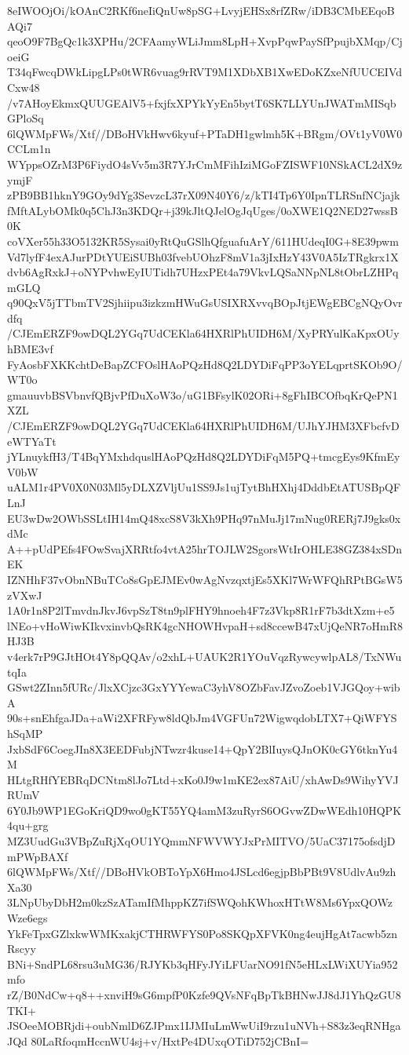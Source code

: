 8eIWOOjOi/kOAnC2RKf6neIiQnUw8pSG+LvyjEHSx8rfZRw/iDB3CMbEEqoBAQi7
qeoO9F7BgQc1k3XPHu/2CFAamyWLiJmm8LpH+XvpPqwPaySfPpujbXMqp/CjoeiG
T34qFwcqDWkLipgLPs0tWR6vuag9rRVT9M1XDbXB1XwEDoKZxeNfUUCEIVdCxw48
/v7AHoyEkmxQUUGEAlV5+fxjfxXPYkYyEn5bytT6SK7LLYUnJWATmMISqbGPloSq
6lQWMpFWs/Xtf//DBoHVkHwv6kyuf+PTaDH1gwlmh5K+BRgm/OVt1yV0W0CCLm1n
WYppsOZrM3P6FiydO4sVv5m3R7YJrCmMFihIziMGoFZISWF10NSkACL2dX9zymjF
zPB9BB1hknY9GOy9dYg3SevzcL37rX09N40Y6/z/kTI4Tp6Y0IpnTLRSnfNCjajk
fMftALybOMk0q5ChJ3n3KDQr+j39kJltQJelOgJqUges/0oXWE1Q2NED27wssB0K
coVXer55h33O5132KR5Sysai0yRtQuGSlhQfguafuArY/611HUdeqI0G+8E39pwm
Vd7lyfF4exAJurPDtYUEiSUBh03fvebUOhzF8mV1a3jIxHzY43V0A5IzTRgkrx1X
dvb6AgRxkJ+oNYPvhwEyIUTidh7UHzxPEt4a79VkvLQSaNNpNL8tObrLZHPqmGLQ
q90QxV5jTTbmTV2Sjhiipu3izkzmHWuGsUSIXRXvvqBOpJtjEWgEBCgNQyOvrdfq
/CJEmERZF9owDQL2YGq7UdCEKla64HXRlPhUIDH6M/XyPRYulKaKpxOUyhBME3vf
FyAosbFXKKchtDeBapZCFOslHAoPQzHd8Q2LDYDiFqPP3oYELqprtSKOb9O/WT0o
gmauuvbBSVbnvfQBjvPfDuXoW3o/uG1BFsylK02ORi+8gFhIBCOfbqKrQePN1XZL
/CJEmERZF9owDQL2YGq7UdCEKla64HXRlPhUIDH6M/UJhYJHM3XFbcfvDeWTYaTt
jYLnuykfH3/T4BqYMxhdquslHAoPQzHd8Q2LDYDiFqM5PQ+tmcgEys9KfmEyV0bW
uALM1r4PV0X0N03Ml5yDLXZVljUu1SS9Js1ujTytBhHXhj4DddbEtATUSBpQFLnJ
EU3wDw2OWbSSLtIH14mQ48xcS8V3kXh9PHq97nMuJj17mNug0RERj7J9gks0xdMc
A++pUdPEfs4FOwSvajXRRtfo4vtA25hrTOJLW2SgorsWtIrOHLE38GZ384xSDnEK
IZNHhF37vObnNBuTCo8sGpEJMEv0wAgNvzqxtjEs5XKl7WrWFQhRPtBGsW5zVXwJ
1A0r1n8P2lTmvdnJkvJ6vpSzT8tn9plFHY9hnoeh4F7z3Vkp8R1rF7b3dtXzm+e5
lNEo+vHoWiwKIkvxinvbQsRK4gcNHOWHvpaH+sd8ccewB47xUjQeNR7oHmR8HJ3B
v4erk7rP9GJtHOt4Y8pQQAv/o2xhL+UAUK2R1YOuVqzRywcywlpAL8/TxNWutqIa
GSwt2ZInn5fURc/JlxXCjzc3GxYYYewaC3yhV8OZbFavJZvoZoeb1VJGQoy+wibA
90s+snEhfgaJDa+aWi2XFRFyw8ldQbJm4VGFUn72WigwqdobLTX7+QiWFYShSqMP
JxbSdF6CoegJIn8X3EEDFubjNTwzr4kuse14+QpY2BlIuysQJnOK0cGY6tknYu4M
HLtgRHfYEBRqDCNtm8lJo7Ltd+xKo0J9w1mKE2ex87AiU/xhAwDs9WihyYVJRUmV
6Y0Jb9WP1EGoKriQD9wo0gKT55YQ4amM3zuRyrS6OGvwZDwWEdh10HQPK4qu+grg
MZ3UudGu3VBpZuRjXqOU1YQmmNFWVWYJxPrMITVO/5UaC37175ofsdjDmPWpBAXf
6lQWMpFWs/Xtf//DBoHVkOBToYpX6Hmo4JSLcd6egjpBbPBt9V8UdlvAu9zhXa30
3LNpUbyDbH2m0kzSzATamIfMhppKZ7ifSWQohKWhoxHTtW8Ms6YpxQOWzWze6egs
YkFeTpxGZlxkwWMKxakjCTHRWFYS0Po8SKQpXFVK0ng4eujHgAt7acwb5znRscyy
BNi+SndPL68rsu3uMG36/RJYKb3qHFyJYiLFUarNO91fN5eHLxLWiXUYia952mfo
rZ/B0NdCw+q8++xnviH9sG6mpfP0Kzfe9QVsNFqBpTkBHNwJJ8dJ1YhQzGU8TKI+
JSOeeMOBRjdi+oubNmlD6ZJPmx1IJMIuLmWwUiI9rzu1uNVh+S83z3eqRNHgaJQd
80LaRfoqmHccnWU4sj+v/HxtPe4DUxqOTiD752jCBnI=
